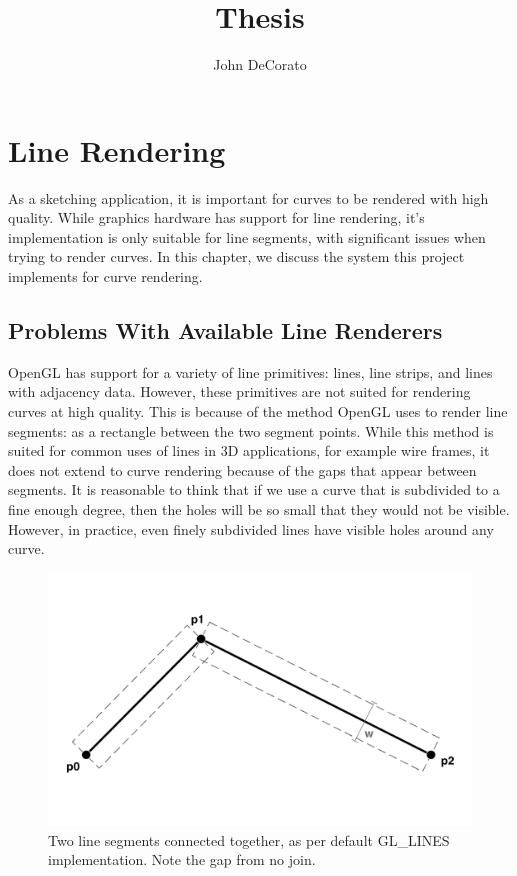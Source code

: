 \documentclass[11pt]{report}
\title{Thesis}
\author{John DeCorato}
\date{ }
\begin{document}
\chapter{Line Rendering}

As a sketching application, it is important for curves to be rendered with high quality.
While graphics hardware has support for line rendering, it's implementation is only suitable for line segments, with significant issues when trying to render curves.
In this chapter, we discuss the system this project implements for curve rendering.

\section{Problems With Available Line Renderers}
OpenGL has support for a variety of line primitives: lines, line strips, and lines with adjacency data.
However, these primitives are not suited for rendering curves at high quality.
This is because of the method OpenGL uses to render line segments: as a rectangle between the two segment points.
While this method is suited for common uses of lines in 3D applications, for example wire frames, it does not extend to curve rendering because of the gaps that appear between segments.
It is reasonable to think that if we use a curve that is subdivided to a fine enough degree, then the holes will be so small that they would not be visible.
However, in practice, even finely subdivided lines have visible holes around any curve.

\begin{figure}
	\includegraphics[width=\textwidth]{linesegment2.png}
	\caption{Two line segments connected together, as per default GL\_LINES implementation. Note the gap from no join.}
\end{figure}
\end{document}

